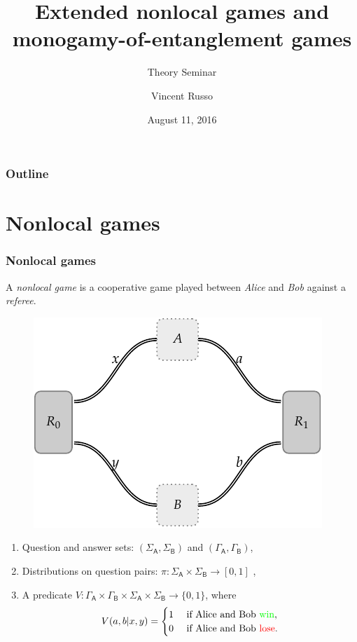 \documentclass{beamer}
\title{Extended nonlocal games and monogamy-of-entanglement games}
\subtitle{Theory Seminar}
\author[V. Russo]{Vincent Russo}
\institute[UWaterloo]{University of Waterloo}
\date{August 11, 2016}
\def \GammaA{\Gamma_{\reg{A}}}
\def \GammaB{\Gamma_{\reg{B}}}
\def \SigmaA{\Sigma_{\reg{A}}}
\def \SigmaB{\Sigma_{\reg{B}}}
\newcommand{\reg}[1]{\mathsf{#1}}
\begin{document}
  {%
    \frame{\titlepage}
  }

  \beamertemplatenavigationsymbolsempty

  \begin{frame}
    \frametitle{Outline}
    \tableofcontents%
  \end{frame}

  \section{Nonlocal games}

\begin{frame}
	\frametitle{Nonlocal games}
	A \emph{nonlocal game} is a cooperative game played between \emph{Alice} and \emph{Bob} against a \emph{referee}. 
	\begin{figure}[!htpb] \label{fig:nonlocal-game}
	\begin{center}
		\includegraphics[scale=0.8]{figures/two_player_game.pdf}
	\end{center}
\end{figure}
	\begin{enumerate}
		\item Question and answer sets: $(\SigmaA, \SigmaB)$ and $(\GammaA, \GammaB)$,
		\item Distributions on question pairs: $\pi: \SigmaA \times \SigmaB \rightarrow [0,1]$ ,
		\item A predicate $V : \GammaA \times \GammaB \times \SigmaA \times \SigmaB \rightarrow \{0,1\}$, where 
\[
 V(a,b|x,y) =
  \begin{cases} 
      \hfill 1 \hfill & \text{ if Alice and Bob \textcolor{green}{win}}, \\
      \hfill 0 \hfill & \text{ if Alice and Bob \textcolor{red}{lose}}. \\
  \end{cases}
\]			
	\end{enumerate}
\end{frame}
\end{document}
